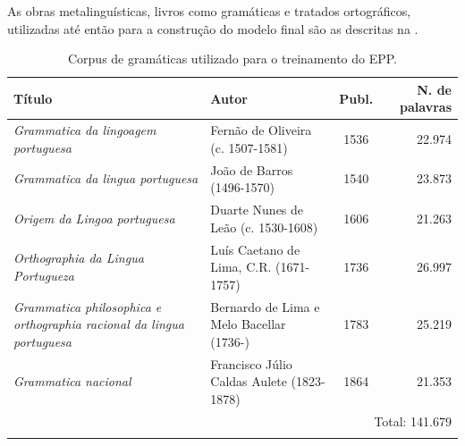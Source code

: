 \documentclass[portuguese]{textolivre}
\begin{document}
As obras metalinguísticas, livros como gramáticas e tratados ortográficos, utilizadas até então para a construção do modelo final são as descritas na .

\begin{table}[h]
\centering
\caption{Corpus de gramáticas utilizado para o treinamento do EPP.}
\label{tab2}
\small
\begin{tabularx}{\textwidth}{X l c r}
\toprule
{Título} & Autor & Publ. & N. de palavras \\
\midrule
\textit{Grammatica da lingoagem portuguesa }& Fernão de Oliveira (c. 1507-1581) & 1536 & 22.974 \\
\textit{Grammatica da lingua portuguesa} & João de Barros (1496-1570) & 1540 & 23.873 \\
\textit{Origem da Lingoa portuguesa }& Duarte Nunes de Leão (c. 1530-1608) & 1606 & 21.263 \\
\textit{Orthographia da Lingua Portugueza} & Luís Caetano de Lima, C.R. (1671-1757) & 1736 & 26.997 \\
\textit{Grammatica philosophica e orthographia racional da lingua portuguesa }& Bernardo de Lima e Melo Bacellar (1736-) & 1783 & 25.219 \\
\textit{Grammatica nacional} & Francisco Júlio Caldas Aulete (1823-1878) & 1864 & 21.353 \\

\multicolumn{4}{r}{Total: 141.679\footnotemark} \\
\bottomrule
\source{\textcite{pachecorocha2025portugues}.}
\end{tabularx}
\end{table}
\end{document}
